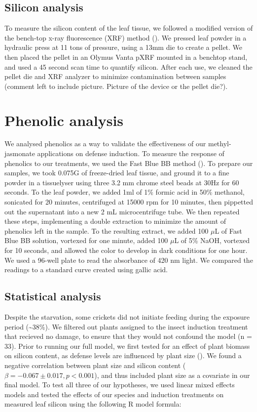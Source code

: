 \documentclass[12pt, letterpaper, ]{report}
\begin{document}
\subsection{Silicon analysis}

To measure the silicon content of the leaf tissue, we followed a modified version of the bench-top x-ray fluorescence (XRF) method (\cite{reidinger_rapid_2012}). We pressed leaf powder in a hydraulic press at 11 tons of pressure, using a 13mm die to create a pellet. We then placed the pellet in an Olymus Vanta pXRF mounted in a benchtop stand, and used a 45 second scan time to quantify silicon. After each use, we cleaned the pellet die and XRF analyzer to minimize contamination between samples (comment left to include picture. Picture of the device or the pellet die?).

\section{Phenolic analysis}

We analysed phenolics as a way to validate the effectiveness of our methyl-jasmonate applications on defense induction. To measure the response of phenolics to our treatments, we used the Fast Blue BB method (\cite{pico2020systematic}). To prepare our samples, we took 0.075G of freeze-dried leaf tissue, and ground it to a fine powder in a tissuelyser using three 3.2 mm chrome steel beads at 30Hz for 60 seconds. To the leaf powder, we added 1ml of 1\% formic acid in 50\% methanol, sonicated for 20 minutes, centrifuged at 15000 rpm for 10 minutes, then pippetted out the supernatant into a new 2 mL  microcentrifuge tube. We then repeated these steps, implementing a double extraction to minimize the amount of phenolics left in the sample. To the resulting extract, we added 100 $\mu$L of Fast Blue BB solution, vortexed for one minute, added 100 $\mu$L of 5\% NaOH, vortexed for 10 seconds, and allowed the color to develop in dark conditions for one hour. We used a 96-well plate to read the absorbance of 420 nm light. We compared the readings to a standard curve created using gallic acid. 

\subsection{Statistical analysis}

Despite the starvation, some crickets did not initiate feeding during the exposure period (\sim38\%). We filtered out plants assigned to the insect induction treatment that recieved no damage, to ensure that they would not confound the model (n = 33). Prior to running our full model, we first tested for an effect of plant biomass on silicon content, as defense levels are influenced by plant size (\cite{carmona_plant_2011}). We found a negative correlation between plant size and silicon content ($\beta = -0.067 \pm 0.017, p < 0.001$), and thus included plant size as a covariate in our final model. To test all three of our hypotheses, we used linear mixed effects models and tested the effects of our species and induction treatments on measured leaf silicon using the following R model formula:
\end{document}
